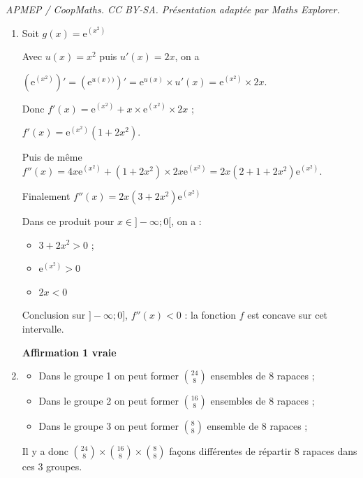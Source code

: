 \documentclass[10pt]{article}
\providecommand{\e}{{\mathrm{e}}}
\providecommand{\ds}{\displaystyle}
\begin{document}
\noindent\textit{APMEP / CoopMaths. CC BY-SA. Présentation adaptée par Maths Explorer.}\par\medskip
\begin{enumerate}
		\item Soit $g(x) = \e^{\left(x^2\right)}$

		Avec $u(x) = x^2$ puis $u'(x) = 2x$, on a

		$\left(\e^{\left(x^2\right)}\right)' = \left(\e^{u(x))}\right)' = \e^{u(x)} \times u'(x) = \e^{\left(x^2\right)} \times 2x$.

		Donc $f'(x) = \e^{\left(x^2\right)} + x \times \e^{\left(x^2\right)} \times 2x$ ;

		$f'(x) = \e^{\left(x^2\right)}\left(1 + 2x^2\right)$.

		Puis de même $f''(x) = 4x\e^{\left(x^2\right)} + \left(1 + 2x^2\right) \times 2x \e^{\left(x^2\right)} = 2x \left(2 + 1 + 2x^2 \right)\e^{\left(x^2\right)}$.

		Finalement $f''(x) = 2x\left(3 + 2x^2 \right)\e^{\left(x^2\right)}$

		Dans ce produit pour $x \in ]- \infty ; 0[$, on a :

		\begin{itemize}
			\item $3 + 2x^2 > 0$ ;
			\item $\e^{\left(x^2\right)} > 0$
			\item $2x < 0$
		\end{itemize}

		Conclusion sur $]-\infty ; 0]$, \: $f''(x) < 0$ : la fonction $f$ est concave sur cet intervalle.

		\hfill\textbf{Affirmation 1 vraie}

		\item \begin{itemize}
			\item Dans le groupe 1 on peut former $\ds\binom{24}{8}$ ensembles de 8 rapaces ;

			\item Dans le groupe 2 on peut former $\ds\binom{16}{8}$ ensembles de 8 rapaces ;

			\item Dans le groupe 3 on peut former $\ds\binom{8}{8}$ ensemble de 8 rapaces ;
		\end{itemize}

		Il y a donc $\ds\binom{24}{8} \times \binom{16}{8} \times \binom{8}{8}$ façons différentes de répartir 8 rapaces dans ces 3 groupes.


\end{enumerate}
\end{document}

